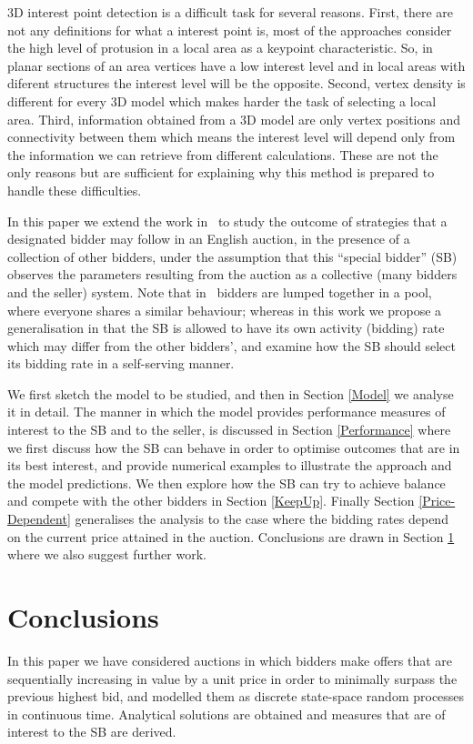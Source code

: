 \documentclass{comjnl}
\begin{document}
3D interest point detection is a difficult task for several reasons. 
First, there are not any definitions for what a interest point is, 
most of the approaches consider the high level of protusion in a local
area as a keypoint characteristic. So, in planar sections of an area
vertices have a low interest level and in local areas with diferent
structures the interest level will be the opposite. Second, vertex 
density is different for every 3D model which makes harder the task of
selecting a local area. Third, information obtained from a 3D model
are only vertex positions and connectivity between them which means
the interest level will depend only from the information we can
retrieve from different calculations. These are not the only reasons
but are sufficient for explaining why this method is prepared to
handle these difficulties. 

In this paper we extend the work in~\cite{gelenbe06} to study the
outcome of strategies that a designated bidder may follow in an
English auction, in the presence of a collection of other bidders,
under the assumption that this ``special bidder'' (SB) observes
the parameters resulting from the auction as a collective (many
bidders and the seller) system. Note that in~\cite{gelenbe06}
bidders are lumped together in a pool, where everyone shares a
similar behaviour; whereas in this work we propose a
generalisation in that the SB is allowed to have its own activity
(bidding) rate which may differ from the other bidders', and
examine how the SB should select its bidding rate in a
self-serving manner.

We first sketch the model to be studied, and then in Section
\ref{Model} we analyse it in detail. The manner in which the model
provides performance measures of interest to the SB and to the
seller, is discussed in Section \ref{Performance} where we first
discuss how the SB can behave in order to optimise outcomes that
are in its best interest, and provide  numerical examples to
illustrate the approach and the model predictions. We then explore
how the SB can try to achieve balance and compete with the other
bidders in Section \ref{KeepUp}. Finally Section
\ref{Price-Dependent} generalises the analysis to the case where
the bidding rates depend on the current price attained in the
auction. Conclusions are drawn in Section \ref{Conclusions} where
we also suggest further work.


\section{Conclusions} \label{Conclusions}
In this paper we have considered auctions in which bidders make
offers that are sequentially increasing in value by a unit price
in order to minimally surpass the previous highest bid, and
modelled them as discrete state-space random processes in
continuous time. Analytical solutions are obtained and measures
that are of interest to the SB are derived.
\end{document}
